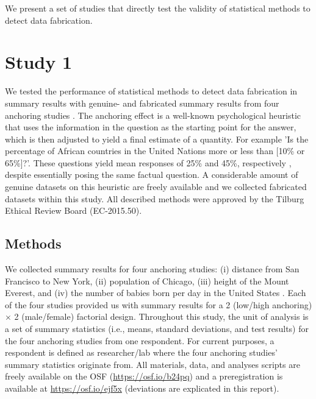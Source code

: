 \documentclass{article}
\begin{document}
We present a set of studies that directly test the validity of statistical methods to detect data fabrication. 


\section*{Study 1}


We tested the performance of statistical methods to detect data fabrication in summary results with genuine- and fabricated summary results from four anchoring studies \citep{tversky1974,jacowitz1995}. The anchoring effect is a well-known psychological heuristic that uses the information in the question as the starting point for the answer, which is then adjusted to yield a final estimate of a quantity. For example 'Is the percentage of African countries in the United Nations more or less than [10\% or 65\%]?'. These questions yield mean responses of 25\% and 45\%, respectively \citep{tversky1974}, despite essentially posing the same factual question. A considerable amount of genuine datasets on this heuristic are freely available and we collected fabricated datasets within this study. All described methods were approved by the Tilburg Ethical Review Board (EC-2015.50).

\subsection*{Methods}

We collected summary results for four anchoring studies: (i) distance from San Francisco to New York, (ii) population of Chicago, (iii) height of the Mount Everest, and (iv) the number of babies born per day in the United States \citep{jacowitz1995}. Each of the four studies provided us with summary results for a 2 (low/high anchoring) $\times$ 2 (male/female) factorial design. Throughout this study, the unit of analysis is a set of summary statistics (i.e., means, standard deviations, and test results) for the four anchoring studies from one respondent. For current purposes, a respondent is defined as researcher/lab where the four anchoring studies' summary statistics originate from. All materials, data, and analyses scripts are freely available on the OSF (\url{https://osf.io/b24pq}) and a preregistration is available at \url{https://osf.io/ejf5x} (deviations are explicated in this report).
\end{document}
